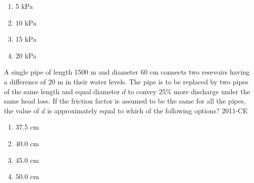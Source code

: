 \begin{figure}[ht]
\centering

\end{figure}
	\begin{multicols}{4}
	\begin{enumerate}
		\item 5 kPa
		\item 10 kPa
		\item 15 kPa
		\item 20 kPa
	\end{enumerate}
	\end{multicols}
\newpage
\item A single pipe of length 1500 m and diameter 60 cm connects two resevoirs having a difference of 20 m in their water levels. The pipe is to be replaced by two pipes of the same length and equal diameter $d$ to convey 25\% more discharge under the same head loss. If the friction factor is assumed to be the same for all the pipes, the value of $d$ is approximately equal to which of the following options?
	\hfill{2011-CE}

	\begin{multicols}{4}
	\begin{enumerate}
		\item 37.5 cm
		\item 40.0 cm
		\item 45.0 cm
		\item 50.0 cm
	\end{enumerate}
	\end{multicols}



